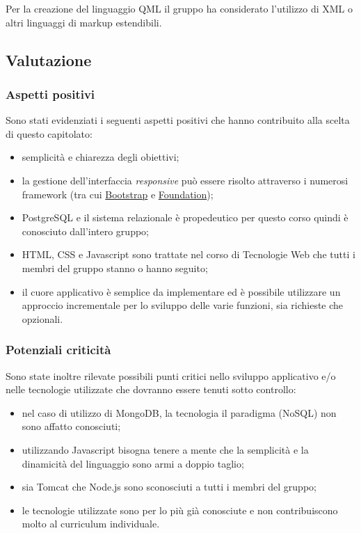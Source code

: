 \documentclass[12pt,a4paper]{article}
\begin{document}
Per la creazione del linguaggio QML il gruppo ha considerato l'utilizzo di XML o altri linguaggi di markup
estendibili.

\subsection{Valutazione}
\subsubsection{Aspetti positivi}

Sono stati evidenziati i seguenti aspetti positivi che hanno contribuito alla scelta di
questo capitolato:

\begin{itemize}
\item semplicità e chiarezza degli obiettivi;
\item la gestione dell'interfaccia \textit{responsive} può essere risolto attraverso i numerosi
    framework (tra cui \href{http://getbootstrap.com}{Bootstrap} e \href{http://foundation.zurb.com}{Foundation});
\item PostgreSQL e il sistema relazionale è propedeutico per questo corso quindi è conosciuto dall'intero gruppo;
\item HTML, CSS e Javascript sono trattate nel corso di Tecnologie Web che tutti i membri del gruppo stanno o hanno
seguito;
\item il cuore applicativo è semplice da implementare ed è possibile utilizzare un approccio incrementale
per lo sviluppo delle varie funzioni, sia richieste che opzionali.
\end{itemize}

\subsubsection{Potenziali criticità}

Sono state inoltre rilevate possibili punti critici nello sviluppo applicativo e/o nelle tecnologie utilizzate
che dovranno essere tenuti sotto controllo:

\begin{itemize}
\item nel caso di utilizzo di MongoDB, la tecnologia il paradigma (NoSQL) non sono affatto conosciuti;
\item utilizzando Javascript bisogna tenere a mente che la semplicità e la dinamicità del linguaggio
sono armi a doppio taglio;
\item sia Tomcat che Node.js sono sconosciuti a tutti i membri del gruppo;
\item le tecnologie utilizzate sono per lo più già conosciute e non contribuiscono molto
al curriculum individuale.
\end{itemize}
\end{document}
